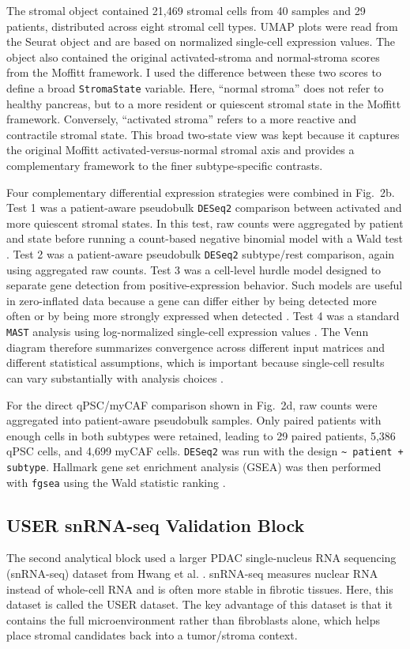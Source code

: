 \documentclass[11pt,a4paper]{article}
\begin{document}
The stromal object contained 21,469 stromal cells from 40 samples and 29 patients, distributed across eight stromal cell types. UMAP plots were read from the Seurat object and are based on normalized single-cell expression values. The object also contained the original activated-stroma and normal-stroma scores from the Moffitt framework. I used the difference between these two scores to define a broad \texttt{StromaState} variable. Here, ``normal stroma'' does not refer to healthy pancreas, but to a more resident or quiescent stromal state in the Moffitt framework. Conversely, ``activated stroma'' refers to a more reactive and contractile stromal state. This broad two-state view was kept because it captures the original Moffitt activated-versus-normal stromal axis and provides a complementary framework to the finer subtype-specific contrasts.

Four complementary differential expression strategies were combined in Fig.~2b. Test 1 was a patient-aware pseudobulk \texttt{DESeq2} comparison between activated and more quiescent stromal states. In this test, raw counts were aggregated by patient and state before running a count-based negative binomial model with a Wald test \citep{love2014}. Test 2 was a patient-aware pseudobulk \texttt{DESeq2} subtype/rest comparison, again using aggregated raw counts. Test 3 was a cell-level hurdle model designed to separate gene detection from positive-expression behavior. Such models are useful in zero-inflated data because a gene can differ either by being detected more often or by being more strongly expressed when detected \citep{finak2015}. Test 4 was a standard \texttt{MAST} analysis using log-normalized single-cell expression values \citep{finak2015}. The Venn diagram therefore summarizes convergence across different input matrices and different statistical assumptions, which is important because single-cell results can vary substantially with analysis choices \citep{vieth2019}.

For the direct qPSC/myCAF comparison shown in Fig.~2d, raw counts were aggregated into patient-aware pseudobulk samples. Only paired patients with enough cells in both subtypes were retained, leading to 29 paired patients, 5,386 qPSC cells, and 4,699 myCAF cells. \texttt{DESeq2} was run with the design \texttt{\textasciitilde{} patient + subtype}. Hallmark gene set enrichment analysis (GSEA) was then performed with \texttt{fgsea} using the Wald statistic ranking \citep{subramanian2005,korotkevich2021}.

\subsection{USER snRNA-seq Validation Block}
The second analytical block used a larger PDAC single-nucleus RNA sequencing (snRNA-seq) dataset from Hwang et al. \citep{peng2020}. snRNA-seq measures nuclear RNA instead of whole-cell RNA and is often more stable in fibrotic tissues. Here, this dataset is called the USER dataset. The key advantage of this dataset is that it contains the full microenvironment rather than fibroblasts alone, which helps place stromal candidates back into a tumor/stroma context.
\end{document}
